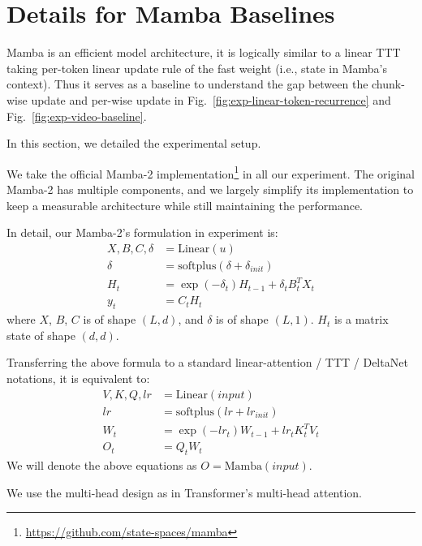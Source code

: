 \documentclass{article}
\begin{document}
\section{Details for Mamba Baselines}

Mamba is an efficient model architecture, it is logically similar to a linear TTT taking per-token linear update rule of the fast weight (i.e., state in Mamba's context).
Thus it serves as a baseline to understand the gap between the chunk-wise update and per-wise update in Fig.~\ref{fig:exp-linear-token-recurrence} and Fig.~\ref{fig:exp-video-baseline}.

In this section, we detailed the experimental setup.

We take the official Mamba-2 implementation\footnote{\hyperlink{https://github.com/state-spaces/mamba}{https://github.com/state-spaces/mamba}} in all our experiment. The original Mamba-2 has multiple components, and we largely simplify its implementation to keep a measurable architecture while still maintaining the performance.

In detail, our Mamba-2's formulation in experiment is:
\begin{align}
    X, B, C, \delta & = \mathrm{Linear}(u) \nonumber \\
    \delta & = \mathrm{softplus}(\delta + \delta_\mathit{init}) \nonumber \\
    H_t &= \exp(-\delta_t) H_{t-1} + \delta_t B_t^T X_t \nonumber \\
    y_t &= C_t H_t 
\end{align}
where $X$, $B$, $C$ is of shape $(L, d)$, and $\delta$ is of shape $(L, 1)$. $H_t$ is a matrix state of shape $(d, d)$.

Transferring the above formula to a standard linear-attention / TTT / DeltaNet notations, it is equivalent to:
\begin{align}
    V, K, Q, \mathit{lr} & = \mathrm{Linear}(\mathit{input}) \nonumber \\
    \mathit{lr} & = \mathrm{softplus}(\mathit{lr} + \mathit{lr}_\mathit{init}) \nonumber \\
    W_t &= \exp(-\mathit{lr}_t) W_{t-1} + \mathit{lr}_t K_t^T V_t   \nonumber \\
    O_t &= Q_t W_t 
    \label{eqn:mamba2}
\end{align}
We will denote the above equations as $O = \mathrm{Mamba}(\mathit{input})$.

We use the multi-head design as in Transformer's multi-head attention.
\end{document}
